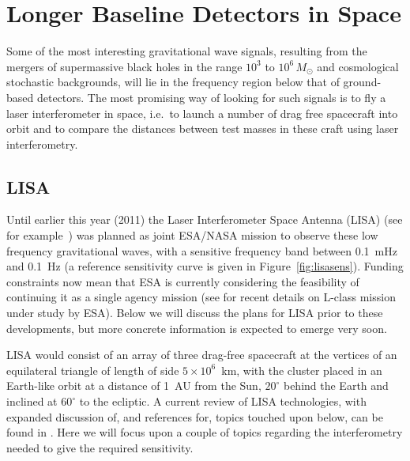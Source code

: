\documentclass{article}
\begin{document}

\newpage

\section{Longer Baseline Detectors in Space}
\label{section:space}

Some of the most interesting gravitational wave signals, resulting from the
mergers of supermassive black holes in the range $10^3$ to $10^{6}\,M_{\odot}$
and cosmological stochastic backgrounds, will lie in the frequency region below
that of ground-based detectors. The most promising way of looking for such
signals is to fly a laser interferometer in space, i.e.\ to launch a number of
drag free spacecraft into orbit and to compare the distances between test
masses in these craft using laser interferometry.

\subsection{LISA}

Until earlier this year (2011) the Laser Interferometer Space Antenna (LISA)
(see for example~\cite{LISA, LISAsymposium, NASAweb, ESAweb}) was planned as
joint ESA/NASA mission to observe these low frequency gravitational waves, with
a sensitive frequency band between 0.1~mHz and 0.1~Hz (a reference sensitivity
curve is given in Figure~\ref{fig:lisasens}). Funding constraints now mean that
ESA is currently considering the feasibility of continuing it as a single agency
mission (see \cite{ESACosmicVisions} for recent details on L-class mission
under study by ESA). Below we will discuss the plans for LISA prior to these
developments, but more concrete information is expected to emerge very soon. 

LISA would consist of an array of three drag-free spacecraft at the vertices of
an equilateral triangle of length of side $5\times10^6$~km, with the cluster
placed in an Earth-like orbit at a distance of 1~AU from the Sun, $20^{\circ}$
behind the Earth and inclined at $60^{\circ}$ to the ecliptic. A current review
of LISA technologies, with expanded discussion of, and references for, topics
touched upon below, can be found in \cite{Jennrich:2009}. Here we will focus
upon a couple of topics regarding the interferometry needed to give the required
sensitivity.
\end{document}

